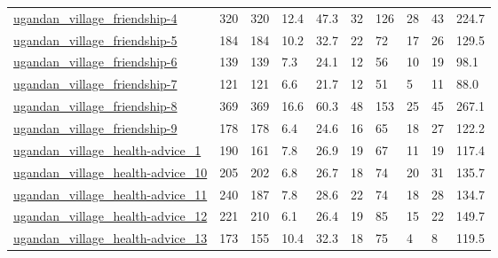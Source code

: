 \begin{longtable}{llllllllll}
 \href{https://www.repository.cam.ac.uk/handle/1810/270256?show=full}{ugandan\_village\_friendship-4}                         & 320        & 320   & 12.4   & 47.3   & 32    & 126    & 28     & 43     & 224.7   \\
 \href{https://www.repository.cam.ac.uk/handle/1810/270256?show=full}{ugandan\_village\_friendship-5}                         & 184        & 184   & 10.2   & 32.7   & 22    & 72     & 17     & 26     & 129.5   \\
 \href{https://www.repository.cam.ac.uk/handle/1810/270256?show=full}{ugandan\_village\_friendship-6}                         & 139        & 139   & 7.3    & 24.1   & 12    & 56     & 10     & 19     & 98.1    \\
 \href{https://www.repository.cam.ac.uk/handle/1810/270256?show=full}{ugandan\_village\_friendship-7}                         & 121        & 121   & 6.6    & 21.7   & 12    & 51     & 5      & 11     & 88.0    \\
 \href{https://www.repository.cam.ac.uk/handle/1810/270256?show=full}{ugandan\_village\_friendship-8}                         & 369        & 369   & 16.6   & 60.3   & 48    & 153    & 25     & 45     & 267.1   \\
 \href{https://www.repository.cam.ac.uk/handle/1810/270256?show=full}{ugandan\_village\_friendship-9}                         & 178        & 178   & 6.4    & 24.6   & 16    & 65     & 18     & 27     & 122.2   \\
 \href{https://www.repository.cam.ac.uk/handle/1810/270256?show=full}{ugandan\_village\_health-advice\_1}                      & 190        & 161   & 7.8    & 26.9   & 19    & 67     & 11     & 19     & 117.4   \\
 \href{https://www.repository.cam.ac.uk/handle/1810/270256?show=full}{ugandan\_village\_health-advice\_10}                     & 205        & 202   & 6.8    & 26.7   & 18    & 74     & 20     & 31     & 135.7   \\
 \href{https://www.repository.cam.ac.uk/handle/1810/270256?show=full}{ugandan\_village\_health-advice\_11}                     & 240        & 187   & 7.8    & 28.6   & 22    & 74     & 18     & 28     & 134.7   \\
 \href{https://www.repository.cam.ac.uk/handle/1810/270256?show=full}{ugandan\_village\_health-advice\_12}                     & 221        & 210   & 6.1    & 26.4   & 19    & 85     & 15     & 22     & 149.7   \\
 \href{https://www.repository.cam.ac.uk/handle/1810/270256?show=full}{ugandan\_village\_health-advice\_13}                     & 173        & 155   & 10.4   & 32.3   & 18    & 75     & 4      & 8      & 119.5   \\

\end{longtable}

